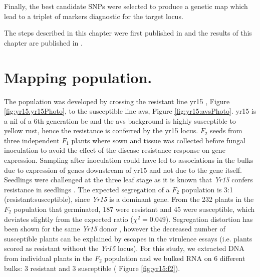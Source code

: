 Finally, the best candidate SNPs were selected to produce a genetic map which lead to a triplet of markers diagnostic for the target locus. 

The steps described in this chapter were first published in \citet{Ramirez-Gonzalez2015c} and the results of this chapter are published in \citet{Ramirez-Gonzalez2015b}.

\section{Mapping population.}

The population was developed by crossing the resistant line \gls{yr15} \citep{Wellings1998}, Figure \ref{fig:yr15.yr15Photo}, to the susceptible line \gls{avs}, Figure \ref{fig:yr15:avsPhoto}. 
\gls{yr15} is a \gls{nil} of a 6th generation \gls{bc} and the \gls{avs} background is highly susceptible to yellow rust, hence the resistance is conferred by the \gls{yr15} locus. 
$F_{2}$ seeds from three independent $F_{1}$ plants where sown and tissue was collected before fungal inoculation to avoid the effect of the disease resistance response on gene expression. 
Sampling after inoculation could have led to associations in the bulks due to expression of genes downstream of \gls{yr15} and not due to the gene itself.
Seedlings were challenged at the three leaf stage as it is known that \textit{Yr15} confers resistance in seedlings \citep{Gerechter-Amitai1989}.
The expected segregation of a $F_{2}$ population is 3:1 (resistant:susceptible), since \textit{Yr15} is a dominant gene.
From the 232 plants in the $F_{2}$ population that germinated, 187 were resistant and 45 were susceptible, which deviates slightly from the expected ratio ($\chi^{2}=0.049$).
Segregation distortion has been shown for the same \textit{Yr15} donor \citep{Randhawa2009}, however the decreased number of susceptible plants can be explained by escapes in the virulence essays (i.e. plants scored as resistant without the \textit{Yr15} locus).
For this study, we extracted DNA from individual plants in the $F_{2}$ population and we bulked RNA on 6 different bulks: 3 resistant and 3 susceptible ( Figure \ref{fig:yr15:f2}). 


